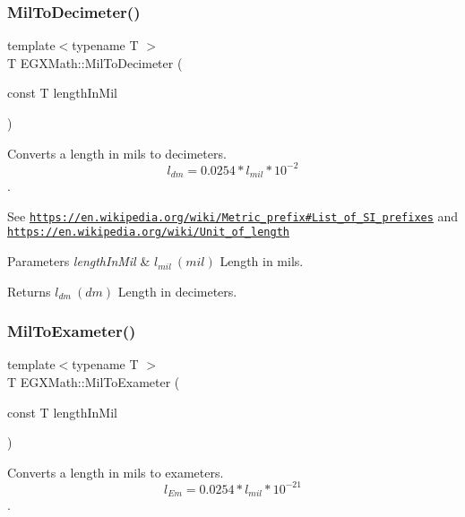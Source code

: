 \subsubsection{\texorpdfstring{Mil\+To\+Decimeter()}{MilToDecimeter()}}
{\footnotesize\ttfamily template$<$typename T $>$ \\
T E\+G\+X\+Math\+::\+Mil\+To\+Decimeter (\begin{DoxyParamCaption}\item[{const T}]{length\+In\+Mil }\end{DoxyParamCaption})}



Converts a length in mils to decimeters. \[ l_{dm}=0.0254* l_{mil} * 10^{-2} \]. 

See \href{https://en.wikipedia.org/wiki/Metric_prefix#List_of_SI_prefixes}{\tt https\+://en.\+wikipedia.\+org/wiki/\+Metric\+\_\+prefix\#\+List\+\_\+of\+\_\+\+S\+I\+\_\+prefixes} and \href{https://en.wikipedia.org/wiki/Unit_of_length}{\tt https\+://en.\+wikipedia.\+org/wiki/\+Unit\+\_\+of\+\_\+length} 
\begin{DoxyParams}{Parameters}
{\em length\+In\+Mil} & $ l_{mil}\ (mil)$ Length in mils. \\
\hline
\end{DoxyParams}
\begin{DoxyReturn}{Returns}
$ l_{dm}\ (dm)$ Length in decimeters. 
\end{DoxyReturn}
\mbox{\label{group___e_g_x_math-_conversions-_length_conversions-_imperial-_mil-_s_i_gae24a05aa769e66474c602e6087fd7351}} 
\subsubsection{\texorpdfstring{Mil\+To\+Exameter()}{MilToExameter()}}
{\footnotesize\ttfamily template$<$typename T $>$ \\
T E\+G\+X\+Math\+::\+Mil\+To\+Exameter (\begin{DoxyParamCaption}\item[{const T}]{length\+In\+Mil }\end{DoxyParamCaption})}



Converts a length in mils to exameters. \[ l_{Em}=0.0254* l_{mil} * 10^{-21} \]. 

